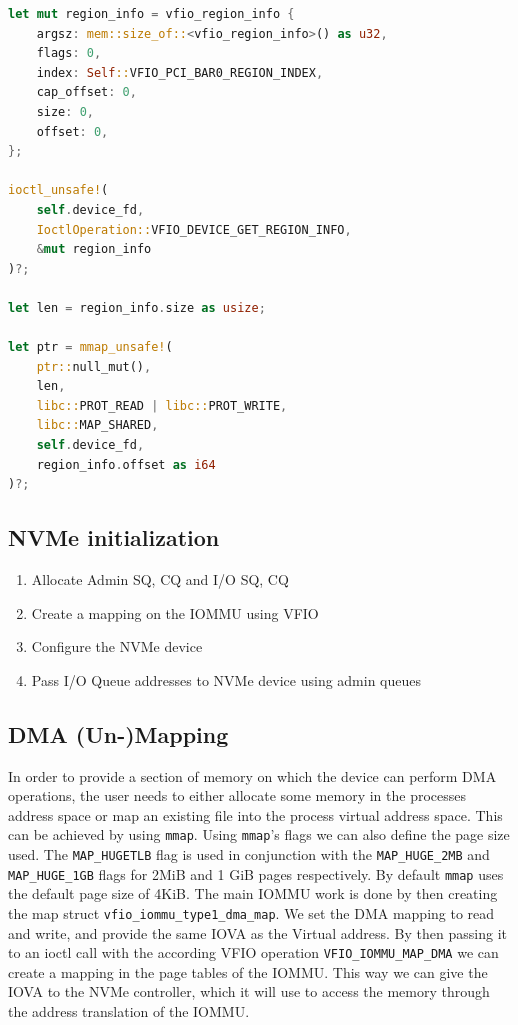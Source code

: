 \begin{minipage}{.95\linewidth}
    \begin{lstlisting}[language=Rust,caption={Mapping the BAR0 NVMe register to memory}, label=lst:bar0map]
let mut region_info = vfio_region_info {
    argsz: mem::size_of::<vfio_region_info>() as u32,
    flags: 0,
    index: Self::VFIO_PCI_BAR0_REGION_INDEX,
    cap_offset: 0,
    size: 0,
    offset: 0,
};

ioctl_unsafe!(
    self.device_fd,
    IoctlOperation::VFIO_DEVICE_GET_REGION_INFO,
    &mut region_info
)?;

let len = region_info.size as usize;

let ptr = mmap_unsafe!(
    ptr::null_mut(),
    len,
    libc::PROT_READ | libc::PROT_WRITE,
    libc::MAP_SHARED,
    self.device_fd,
    region_info.offset as i64
)?; 
\end{lstlisting}
\end{minipage}

\subsection{NVMe initialization}\label{sec:nvmeinit}


\begin{enumerate}
    \item Allocate Admin SQ, CQ and I/O SQ, CQ
    \item Create a mapping on the IOMMU using VFIO
    \item Configure the NVMe device
    \item Pass I/O Queue addresses to NVMe device using admin queues
\end{enumerate}

\subsection{DMA (Un-)Mapping}\label{sec:dmamapping}
In order to provide a section of memory on which the device can perform DMA operations, the user needs to either allocate some memory in the processes address space or map an existing file into the process virtual address space. This can be achieved by using \texttt{mmap}. Using \texttt{mmap}'s flags we can also define the page size used. The \texttt{MAP\_HUGETLB} flag is used in conjunction with the \texttt{MAP\_HUGE\_2MB} and \texttt{MAP\_HUGE\_1GB} flags for 2MiB and 1 GiB pages respectively. By default \texttt{mmap} uses the default page size of 4KiB.
The main IOMMU work is done by then creating the map struct \texttt{vfio\_iommu\_type1\_dma\_map}. We set the DMA mapping to read and write, and provide the same IOVA as the Virtual address. By then passing it to an ioctl call with the according VFIO operation \texttt{VFIO\_IOMMU\_MAP\_DMA} we can create a mapping in the page tables of the IOMMU. This way we can give the IOVA to the NVMe controller, which it will use to access the memory through the address translation of the IOMMU.

